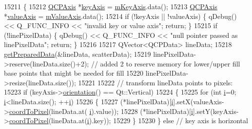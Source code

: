\begin{DoxyCode}
15211 \{
15212   \hyperlink{class_q_c_p_axis}{QCPAxis} *\hyperlink{class_q_c_p_abstract_plottable_a72c7a09c22963f2c943f07112b311103}{keyAxis} = \hyperlink{class_q_c_p_abstract_plottable_a426f42e254d0f8ce5436a868c61a6827}{mKeyAxis}.data();
15213   \hyperlink{class_q_c_p_axis}{QCPAxis} *\hyperlink{class_q_c_p_abstract_plottable_a3106f9d34d330a6097a8ec5905e5b519}{valueAxis} = \hyperlink{class_q_c_p_abstract_plottable_a2901452ca4aea911a1827717934a4bda}{mValueAxis}.data();
15214   \textcolor{keywordflow}{if} (!keyAxis || !valueAxis) \{ qDebug() << Q\_FUNC\_INFO << \textcolor{stringliteral}{"invalid key or value axis"}; \textcolor{keywordflow}{return}; \}
15215   \textcolor{keywordflow}{if} (!linePixelData) \{ qDebug() << Q\_FUNC\_INFO << \textcolor{stringliteral}{"null pointer passed as linePixelData"}; \textcolor{keywordflow}{return}; \}
15216   
15217   QVector<QCPData> lineData;
15218   \hyperlink{class_q_c_p_graph_ab420b46ba638dc3252439fe16687b244}{getPreparedData}(&lineData, scatterData);
15219   linePixelData->reserve(lineData.size()+2); \textcolor{comment}{// added 2 to reserve memory for lower/upper fill base points
       that might be needed for fill}
15220   linePixelData->resize(lineData.size());
15221   
15222   \textcolor{comment}{// transform lineData points to pixels:}
15223   \textcolor{keywordflow}{if} (keyAxis->\hyperlink{class_q_c_p_axis_a57483f2f60145ddc9e63f3af53959265}{orientation}() == Qt::Vertical)
15224   \{
15225     \textcolor{keywordflow}{for} (\textcolor{keywordtype}{int} \hyperlink{_comparision_pictures_2_createtest_image_8m_a6f6ccfcf58b31cb6412107d9d5281426}{i}=0; \hyperlink{_comparision_pictures_2_createtest_image_8m_a6f6ccfcf58b31cb6412107d9d5281426}{i}<lineData.size(); ++\hyperlink{_comparision_pictures_2_createtest_image_8m_a6f6ccfcf58b31cb6412107d9d5281426}{i})
15226     \{
15227       (*linePixelData)[\hyperlink{_comparision_pictures_2_createtest_image_8m_a6f6ccfcf58b31cb6412107d9d5281426}{i}].setX(valueAxis->\hyperlink{class_q_c_p_axis_a985ae693b842fb0422b4390fe36d299a}{coordToPixel}(lineData.at(
      \hyperlink{_comparision_pictures_2_createtest_image_8m_a6f6ccfcf58b31cb6412107d9d5281426}{i}).value));
15228       (*linePixelData)[\hyperlink{_comparision_pictures_2_createtest_image_8m_a6f6ccfcf58b31cb6412107d9d5281426}{i}].setY(keyAxis->\hyperlink{class_q_c_p_axis_a985ae693b842fb0422b4390fe36d299a}{coordToPixel}(lineData.at(\hyperlink{_comparision_pictures_2_createtest_image_8m_a6f6ccfcf58b31cb6412107d9d5281426}{i}).key));
15229     \}
15230   \} \textcolor{keywordflow}{else} \textcolor{comment}{// key axis is horizontal}

\end{DoxyCode}
